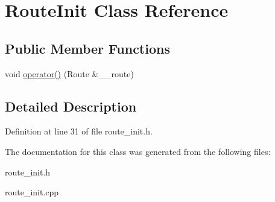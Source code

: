 \hypertarget{classRouteInit}{
\section{Route\-Init Class Reference}
\label{classRouteInit}
}
\subsection*{Public Member Functions}
\begin{CompactItemize}
\item 
\hypertarget{classRouteInit_b65a7137e114458faadb6a5510c001f7}{
void \hyperlink{classRouteInit_b65a7137e114458faadb6a5510c001f7}{operator()} (Route \&\_\-\_\-route)}
\label{classRouteInit_b65a7137e114458faadb6a5510c001f7}

\end{CompactItemize}


\subsection{Detailed Description}




Definition at line 31 of file route\_\-init.h.

The documentation for this class was generated from the following files:\begin{CompactItemize}
\item 
route\_\-init.h\item 
route\_\-init.cpp\end{CompactItemize}
